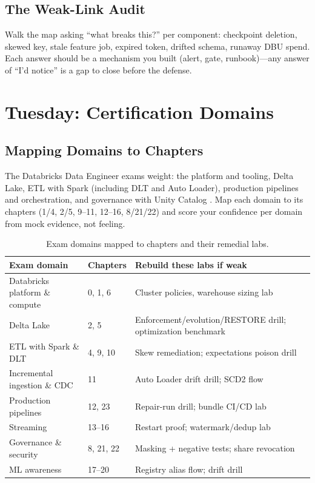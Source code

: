 \subsection{The Weak-Link Audit}
Walk the map asking ``what breaks this?'' per component: checkpoint deletion, skewed key, stale feature job, expired token, drifted schema, runaway DBU spend. Each answer should be a mechanism you built (alert, gate, runbook)---any answer of ``I'd notice'' is a gap to close before the defense.

\section{Tuesday: Certification Domains}
\subsection{Mapping Domains to Chapters}
The Databricks Data Engineer exams weight: the platform and tooling, Delta Lake, ETL with Spark (including DLT and Auto Loader), production pipelines and orchestration, and governance with Unity Catalog \cite{databricksCertification}. Map each domain to its chapters (1/4, 2/5, 9--11, 12--16, 8/21/22) and score your confidence per domain from mock evidence, not feeling.

\begin{table}[H]
\centering
\small
\begin{tabular}{@{}p{4.6cm}p{3.6cm}p{4.6cm}@{}}
\toprule
\textbf{Exam domain} & \textbf{Chapters} & \textbf{Rebuild these labs if weak} \\
\midrule
Databricks platform \& compute & 0, 1, 6 & Cluster policies, warehouse sizing lab \\
Delta Lake & 2, 5 & Enforcement/evolution/RESTORE drill; optimization benchmark \\
ETL with Spark \& DLT & 4, 9, 10 & Skew remediation; expectations poison drill \\
Incremental ingestion \& CDC & 11 & Auto Loader drift drill; SCD2 flow \\
Production pipelines & 12, 23 & Repair-run drill; bundle CI/CD lab \\
Streaming & 13--16 & Restart proof; watermark/dedup lab \\
Governance \& security & 8, 21, 22 & Masking + negative tests; share revocation \\
ML awareness & 17--20 & Registry alias flow; drift drill \\
\bottomrule
\end{tabular}
\caption{Exam domains mapped to chapters and their remedial labs.}
\label{tab:ch24-domains}
\end{table}

